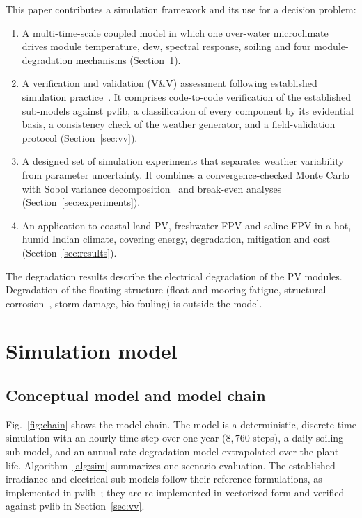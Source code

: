 \documentclass[preprint,11pt]{elsarticle}
\begin{document}
This paper contributes a simulation framework and its use for a decision problem:
\begin{enumerate}
\item A multi-time-scale coupled model in which one over-water microclimate drives module temperature, dew, spectral
response, soiling and four module-degradation mechanisms (Section~\ref{sec:model}).
\item A verification and validation (V\&V) assessment following established simulation practice~\cite{sargent2013,
oberkampf2010}. It comprises code-to-code verification of the established sub-models against pvlib, a classification of
every component by its evidential basis, a consistency check of the weather generator, and a field-validation protocol
(Section~\ref{sec:vv}).
\item A designed set of simulation experiments that separates weather variability from parameter uncertainty. It
combines a convergence-checked Monte Carlo with Sobol variance decomposition~\cite{sobol2001,saltelli2010} and
break-even analyses (Section~\ref{sec:experiments}).
\item An application to coastal land PV, freshwater FPV and saline FPV in a hot, humid Indian climate, covering energy,
degradation, mitigation and cost (Section~\ref{sec:results}).
\end{enumerate}
The degradation results describe the electrical degradation of the PV modules. Degradation of the floating structure
(float and mooring fatigue, structural corrosion~\cite{xiong2025,feng2025}, storm damage, bio-fouling) is outside the
model.

\section{Simulation model}\label{sec:model}

\subsection{Conceptual model and model chain}
Fig.~\ref{fig:chain} shows the model chain. The model is a deterministic, discrete-time simulation with an hourly time
step over one year ($8{,}760$ steps), a daily soiling sub-model, and an annual-rate degradation model extrapolated over
the plant life. Algorithm~\ref{alg:sim} summarizes one scenario evaluation. The established irradiance and electrical
sub-models follow their reference formulations, as implemented in pvlib~\cite{holmgren2018,anderson2023}; they are
re-implemented in vectorized form and verified against pvlib in Section~\ref{sec:vv}.
\end{document}
